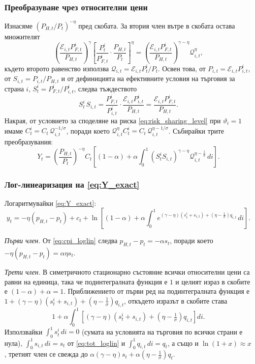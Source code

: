 \subsubsection*{Преобразуване чрез относителни цени}

Изнасяме $(P_{H,t}/P_t)^{-\eta}$ пред скобата. За втория член вътре в скобата остава множителят
\[
\left( \frac{\mathcal{E}_{i,t} P^i_{F,t}}{P_{H,t}} \right)^{\gamma}
\left[ \frac{P^i_t}{P^i_{F,t}} \cdot \frac{P_{H,t}}{P_t} \right]^{\eta}
= \left( \frac{\mathcal{E}_{i,t} P^i_{F,t}}{P_{H,t}} \right)^{\gamma - \eta} \mathcal{Q}_{i,t}^{\eta},
\]
където второто равенство използва $\mathcal{Q}_{i,t} = \mathcal{E}_{i,t}P^i_t / P_t$. Освен това, от $P_{i,t} = \mathcal{E}_{i,t}P^i_{i,t}$, от $S_{i,t} = P_{i,t}/P_{H,t}$ и от дефиницията на ефективните условия на търговия за страна $i$, $S^i_t = P^i_{F,t}/P^i_{i,t}$, следва тъждеството
\begin{equation}
S^i_t\, S_{i,t}
= \frac{P^i_{F,t}}{P^i_{i,t}} \cdot \frac{\mathcal{E}_{i,t} P^i_{i,t}}{P_{H,t}}
= \frac{\mathcal{E}_{i,t} P^i_{F,t}}{P_{H,t}}.
\label{eq:tot_identity}
\end{equation}
Накрая, от условието за споделяне на риска \eqref{eq:risk_sharing_level} при $\vartheta_i = 1$ имаме $C^i_t = C_t\, \mathcal{Q}_{i,t}^{-1/\sigma}$, поради което $\mathcal{Q}_{i,t}^{\eta} C^i_t = C_t\, \mathcal{Q}_{i,t}^{\eta - 1/\sigma}$. Събирайки трите преобразувания:
\begin{equation}
Y_t = \left( \frac{P_{H,t}}{P_t} \right)^{-\eta} C_t
\left[ (1-\alpha) + \alpha \int_0^1 \left( S^i_t S_{i,t} \right)^{\gamma-\eta} \mathcal{Q}_{i,t}^{\eta - \frac{1}{\sigma}}\, di \right].
\label{eq:Y_exact}
\end{equation}

\subsubsection*{Лог-линеаризация на \eqref{eq:Y_exact}}

Логаритмувайки \eqref{eq:Y_exact}:
\[
y_t = -\eta\left( p_{H,t} - p_t \right) + c_t
+ \ln\!\left[ (1-\alpha) + \alpha \int_0^1 e^{(\gamma-\eta)(s^i_t + s_{i,t}) + (\eta - \frac{1}{\sigma}) q_{i,t}}\, di \right].
\]

\emph{Първи член.} От \eqref{eq:cpi_loglin} следва $p_{H,t} - p_t = -\alpha s_t$, поради което $-\eta(p_{H,t}-p_t) = \alpha\eta s_t$.

\emph{Трети член.} В симетричното стационарно състояние всички относителни цени са равни на единица, така че подинтегралната функция е $1$ и целият израз в скобите е $(1-\alpha) + \alpha = 1$. Приближението от първи ред на подинтегралната функция е
$1 + (\gamma-\eta)(s^i_t + s_{i,t}) + \left( \eta - \tfrac{1}{\sigma} \right) q_{i,t}$,
откъдето изразът в скобите става
\[
1 + \alpha \int_0^1 \left[ (\gamma - \eta)(s^i_t + s_{i,t}) + \left( \eta - \tfrac{1}{\sigma} \right) q_{i,t} \right] di.
\]
Използвайки $\int_0^1 s^i_t\, di = 0$ (сумата на условията на търговия по всички страни е нула), $\int_0^1 s_{i,t}\, di = s_t$ от \eqref{eq:tot_loglin} и $\int_0^1 q_{i,t}\, di = q_t$, а също и $\ln(1+x) \approx x$, третият член се свежда до
$\alpha(\gamma-\eta)s_t + \alpha\left( \eta - \tfrac{1}{\sigma} \right) q_t$.


